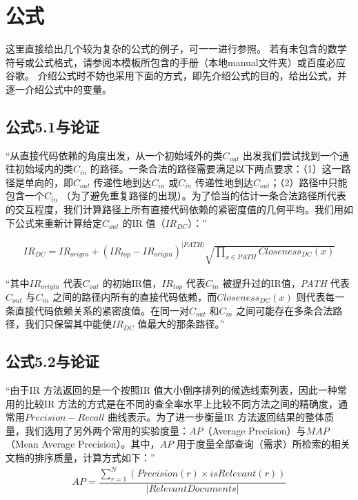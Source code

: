\chapter{公式}

这里直接给出几个较为复杂的公式的例子，可一一进行参照。
若有未包含的数学符号或公式格式，请参阅本模板所包含的手册（本地manual文件夹）或百度必应谷歌。
介绍公式时不妨也采用下面的方式，即先介绍公式的目的，给出公式，并逐一介绍公式中的变量。

\section{公式5.1与论证}
“从直接代码依赖的角度出发，从一个初始域外的类$C_{out}$ 出发我们尝试找到一个通往初始域内的类$C_{in}$ 的路径。一条合法的路径需要满足以下两点要求：（1）这一路径是单向的，即$C_{out}$ 传递性地到达$C_{in}$ 或$C_{in}$ 传递性地到达$C_{out}$；（2）路径中只能包含一个$C_{in}$ （为了避免重复路径的出现）。为了恰当的估计一条合法路径所代表的交互程度，我们计算路径上所有直接代码依赖的紧密度值的几何平均。我们用如下公式来重新计算给定$C_{out}$ 的IR 值（$IR_{DC}$）：”

\begin{align}
IR_{DC}=IR_{origin}+(IR_{top}-IR_{origin})^{\left| PATH\right|}\sqrt {\prod _{x \in PATH}Closeness_{DC}(x)} \end{align}

“其中$IR_{origin}$ 代表$C_{out}$ 的初始IR值，$IR_{top}$ 代表$C_{in}$ 被提升过的IR值，\emph{PATH} 代表$C_{out}$ 与$C_{in}$ 之间的路径内所有的直接代码依赖，而$Closeness_{DC}(x)$ 则代表每一条直接代码依赖关系的紧密度值。在同一对$C_{out}$ 和$C_{in}$ 之间可能存在多条合法路径，我们只保留其中能使$IR_{DC}$ 值最大的那条路径。”

\section{公式5.2与论证}

“由于IR 方法返回的是一个按照IR 值大小倒序排列的候选线索列表，因此一种常用的比较IR 方法的方式是在不同的查全率水平上比较不同方法之间的精确度，通常用$Precision-Recall$ 曲线表示。为了进一步衡量IR 方法返回结果的整体质量，我们选用了另外两个常用的实验度量：$AP$（Average Precision）与$MAP$ （Mean Average Precision）。其中，$AP$ 用于度量全部查询（需求）所检索的相关文档的排序质量，计算方式如下：”
\begin{align}
AP=\dfrac {\sum _{r=1}^{N}\left( Precision\left( r\right) \times isRelevant\left( r\right) \right) } {\left| RelevantDocuments\right| }
\end{align}

